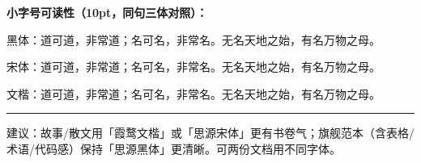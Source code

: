 \documentclass[12pt,a4paper,fontset=none]{ctexart}
\begin{document}
{\heiB\bfseries\color{ink} 小字号可读性（10pt，同句三体对照）：}\par
\vspace{4pt}
{\small\heiR 黑体：道可道，非常道；名可名，非常名。无名天地之始，有名万物之母。}\par
{\small\songR 宋体：道可道，非常道；名可名，非常名。无名天地之始，有名万物之母。}\par
{\small\kaiR 文楷：道可道，非常道；名可名，非常名。无名天地之始，有名万物之母。}\par

\vfill
{\color{rule}\rule{\linewidth}{1pt}}\par\vspace{4pt}
{\heiR\small\color{gray} 建议：故事/散文用「霞鹜文楷」或「思源宋体」更有书卷气；旗舰范本（含表格/术语/代码感）保持「思源黑体」更清晰。可两份文档用不同字体。}
\end{document}
